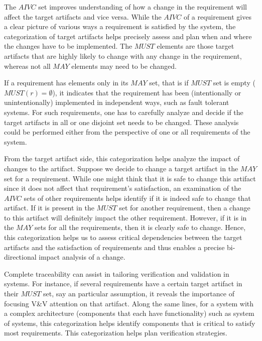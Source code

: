 The $AIVC$ set improves understanding of how a change in the requirement will affect the target artifacts and vice versa. While the $AIVC$ of a requirement gives a clear picture of various ways a requirement is satisfied by the system, the categorization of target artifacts helps precisely assess and plan when and where the changes have to be implemented. The $MUST$ elements are those target artifacts that are highly likely to change with any change in the requirement, whereas not all $MAY$ elements may need to be changed.

If a requirement has elements only in its $MAY$ set, that is if $MUST$ set is empty 
($MUST(r) = \emptyset$), it indicates that the requirement has been (intentionally or unintentionally) implemented in independent ways, such as fault tolerant systems. For such requirements, one has to carefully analyze and decide if the target artifacts in all or one disjoint set needs to be changed. These analysis could be performed either from the perspective of one or all requirements of the system.

From the target artifact side, this categorization helps analyze the impact of changes to the artifact. Suppose we decide to change a target artifact in the $MAY$ set for a requirement. While one might think that it is safe to change this artifact since it does not affect that requirement's satisfaction, an examination of the $AIVC$ sets of other requirements helps identify if it is indeed safe to change that artifact. If it is present in the $MUST$ set for another requirement, then a change to this artifact will definitely impact the other requirement. However, if it is in the $MAY$ sets for all the requirements, then it is clearly safe to change. Hence, this categorization helps us to assess critical dependencies between the target artifacts and the satisfaction of requirements and thus enables a precise bi-directional impact analysis of a change.

Complete traceability can assist in tailoring verification and validation in systems. For instance, if several requirements have a certain target artifact in their $MUST$ set, say an particular assumption, it reveals the importance of focusing V\&V attention on that artifact. Along the same lines, for a system with a complex architecture (components that each have functionality) such as  system of systems, this categorization helps identify components that is critical to satisfy most requirements. This categorization helps plan verification strategies.

